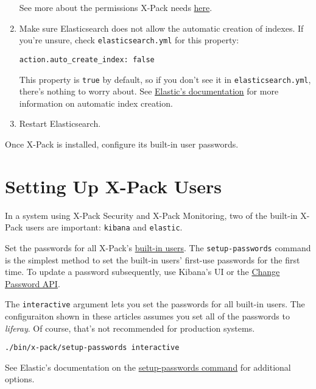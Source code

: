 \begin{enumerate}
  See more about the permissions X-Pack needs
  \href{https://www.elastic.co/guide/en/elasticsearch/reference/6.1/installing-xpack-es.html}{here}.
\item
  Make sure Elasticsearch does not allow the automatic creation of
  indexes. If you're unsure, check \texttt{elasticsearch.yml} for this
  property:

\begin{verbatim}
action.auto_create_index: false
\end{verbatim}

  This property is \texttt{true} by default, so if you don't see it in
  \texttt{elasticsearch.yml}, there's nothing to worry about. See
  \href{https://www.elastic.co/guide/en/elasticsearch/reference/6.1/docs-index_.html\#index-creation}{Elastic's
  documentation} for more information on automatic index creation.
\item
  Restart Elasticsearch.
\end{enumerate}

Once X-Pack is installed, configure its built-in user passwords.

\section{Setting Up X-Pack Users}\label{setting-up-x-pack-users-1}

In a system using X-Pack Security and X-Pack Monitoring, two of the
built-in X-Pack users are important: \texttt{kibana} and
\texttt{elastic}.

Set the passwords for all X-Pack's
\href{https://www.elastic.co/guide/en/x-pack/6.1/setting-up-authentication.html\#built-in-users}{built-in
users}. The \texttt{setup-passwords} command is the simplest method to
set the built-in users' first-use passwords for the first time. To
update a password subsequently, use Kibana's UI or the
\href{https://www.elastic.co/guide/en/elasticsearch/reference/6.1/security-api-change-password.html}{Change
Password API}.

The \texttt{interactive} argument lets you set the passwords for all
built-in users. The configuraiton shown in these articles assumes you
set all of the passwords to \emph{liferay}. Of course, that's not
recommended for production systems.

\begin{verbatim}
./bin/x-pack/setup-passwords interactive
\end{verbatim}

See Elastic's documentation on the
\href{https://www.elastic.co/guide/en/elasticsearch/reference/6.1/setup-passwords.html}{setup-passwords
command} for additional options.

